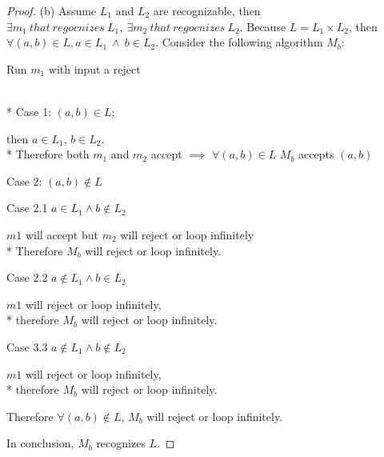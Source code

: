 \documentclass{article}
\begin{document}
\begin{proof}
    (b) Assume $L_1$ and $L_2$ are recognizable,
    then $\exists m_1\ that\ regocnizes\ L_1,\ \exists m_2\ that\ regocnizes\ L_2$. \newline
    Because $L = L_1 \times L_2$, then $\forall (a,b) \in L, a \in L_1\ \land\ b \in L_2.$ \newline
    Consider the following algorithm $M_b$:
    \begin{algorithm}
        \caption{$M_b$}
        \DontPrintSemicolon

        Run $m_1$ with input a\;
        \Return reject\;
    \end{algorithm}  \\*
    Case 1: $(a,b) \in L$:
    \begin{addmargin}[1em]{0em}
        then $a \in L_1$, $b \in L_2$. \\*
        Therefore both $m_1$ and $m_2$ accept
        $\implies$ $\forall (a,b) \in L$ $M_b$ accepts $(a,b)$
    \end{addmargin}
    Case 2: $(a,b) \notin L$
    \begin{addmargin}[1em]{0em}
        Case 2.1 $a \in L_1 \land b \notin L_2$
        \begin{addmargin}[1em]{0em}
            $m1$ will accept but $m_2$ will reject or loop infinitely\\*
            Therefore $M_b$ will reject or loop infinitely.
        \end{addmargin}
        Case 2.2 $a \notin L_1 \land b \in L_2$
        \begin{addmargin}[1em]{0em}
            $m1$ will reject or loop infinitely,\\*
            therefore $M_b$ will reject or loop infinitely.
        \end{addmargin}
        Case 3.3 $a \notin L_1 \land b \notin L_2$
        \begin{addmargin}[1em]{0em}
            $m1$ will reject or loop infinitely,\\*
            therefore $M_b$ will reject or loop infinitely.
        \end{addmargin}
        Therefore $\forall (a, b) \notin L$, $M_b$ will reject or loop infinitely.
    \end{addmargin}
    In conclusion, $M_b$ recognizes $L$.
\end{proof}
\end{document}
